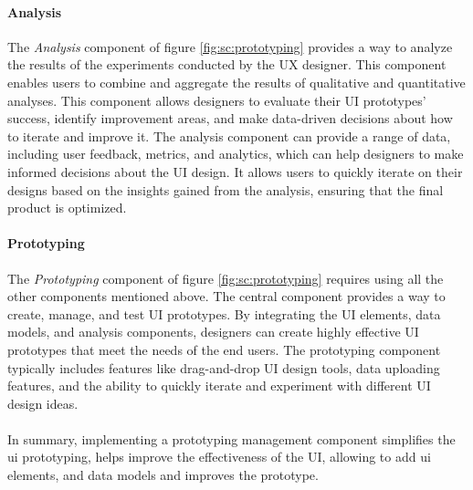 \paragraph{Analysis}
The \textit{Analysis} component of figure \ref{fig:sc:prototyping} provides a way to analyze the results of the experiments conducted by the UX designer. 
This component enables users to combine and aggregate the results of qualitative and quantitative analyses.
This component allows designers to evaluate their UI prototypes' success, identify improvement areas, and make data-driven decisions about how to iterate and improve it. 
The analysis component can provide a range of data, including user feedback, metrics, and analytics, which can help designers to make informed decisions about the UI design.
It allows users to quickly iterate on their designs based on the insights gained from the analysis, ensuring that the final product is optimized.

\paragraph{Prototyping}
The \textit{Prototyping} component of figure \ref{fig:sc:prototyping} requires using all the other components mentioned above. 
The central component provides a way to create, manage, and test UI prototypes. 
By integrating the UI elements, data models, and analysis components, designers can create highly effective UI prototypes that meet the needs of the end users. 
The prototyping component typically includes features like drag-and-drop UI design tools, data uploading features, and the ability to quickly iterate and experiment with different UI design ideas.\\\\
In summary, implementing a prototyping management component simplifies the \ac{ui} prototyping, helps improve the effectiveness of the UI, allowing to add \ac{ui} elements, and data models and improves the prototype.

